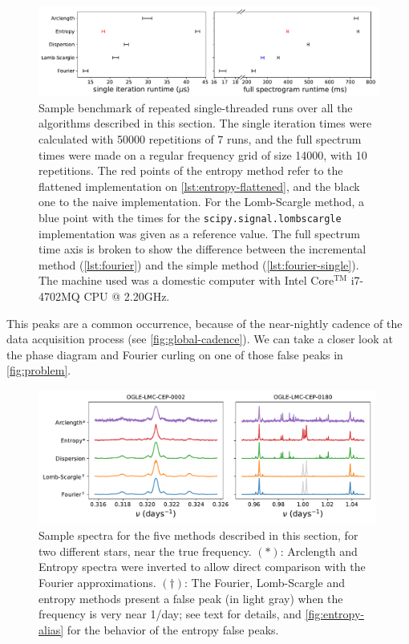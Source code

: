 \begin{figure}
	\centering
	\includegraphics[width=\textwidth]{img/runtimes.pdf}
	\caption[Illustrative benchmark for the algorithms]{
		Sample benchmark of repeated single-threaded runs over all the algorithms described in this section.
		The single iteration times were calculated with 50000 repetitions of 7 runs, 
		and the full spectrum times were made on a regular frequency grid of size 14000, with 10 repetitions.
		The red points of the entropy method refer to the flattened implementation on \autoref{lst:entropy-flattened},
		and the black one to the naive implementation.
		For the Lomb-Scargle method, a blue point with the times for the \texttt{scipy.signal.lombscargle} implementation was given as a reference value.
		The full spectrum time axis is broken to show the difference between the incremental method (\autoref{lst:fourier}) and the simple method (\autoref{lst:fourier-single}).
		The machine used was a domestic computer with Intel \textregistered{} Core$^{\text{TM}}$ i7-4702MQ CPU @ 2.20GHz.
	}
	\label{fig:runtimes}
\end{figure}

This peaks are a common occurrence, because of the near-nightly cadence of the data acquisition process (see \autoref{fig:global-cadence}).
We can take a closer look at the phase diagram and Fourier curling on one of those false peaks in \autoref{fig:problem}.

\begin{figure}
	\centering
	\includegraphics[width=0.99\textwidth]{img/examples.pdf}
	\caption[Example of spectra near the true frequency]{
		Sample spectra for the five methods described in this section, for two different stars, near the true frequency.
		$(\ast)$: Arclength and Entropy spectra were inverted to allow direct comparison with the Fourier approximations.
		$(\dagger)$: The Fourier, Lomb-Scargle and entropy methods present a false peak (in light gray) 
		when the frequency is very near 1/day; see text for details, and \autoref{fig:entropy-alias} for the behavior of the entropy false peaks.
	}
	\label{fig:examples}
\end{figure}

